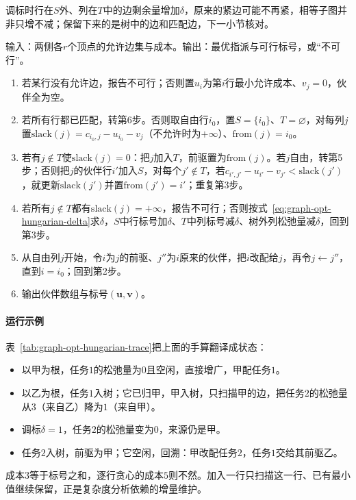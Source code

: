 调标时行在$S$外、列在$T$中的边剩余量增加$\delta$，原来的紧边可能不再紧，相等子图并非只增不减；保留下来的是树中的边和匹配边，下一小节核对。

\begin{algorithm}[KM算法]
\label{alg:graph-opt-hungarian}
输入：两侧各$r$个顶点的允许边集与成本。输出：最优指派与可行标号，或“不可行”。
\begin{enumerate}
  \item 若某行没有允许边，报告不可行；否则置$u_i$为第$i$行最小允许成本、$v_j=0$，伙伴全为空。
  \item 若所有行都已匹配，转第6步。否则取自由行$i_0$，置$S=\{i_0\}$、$T=\varnothing$，对每列$j$置$\mathrm{slack}(j)=c_{i_0,j}-u_{i_0}-v_j$（不允许时为$+\infty$）、$\mathrm{from}(j)=i_0$。
  \item 若有$j\notin T$使$\mathrm{slack}(j)=0$：把$j$加入$T$，前驱置为$\mathrm{from}(j)$。若$j$自由，转第5步；否则把$j$的伙伴行$i'$加入$S$，对每个$j'\notin T$，若$c_{i',j'}-u_{i'}-v_{j'}<\mathrm{slack}(j')$，就更新$\mathrm{slack}(j')$并置$\mathrm{from}(j')=i'$；重复第3步。
  \item 若所有$j\notin T$都有$\mathrm{slack}(j)=+\infty$，报告不可行；否则按式~\eqref{eq:graph-opt-hungarian-delta}求$\delta$，$S$中行标号加$\delta$、$T$中列标号减$\delta$、树外列松弛量减$\delta$，回到第3步。
  \item 从自由列$j$开始，令$i$为$j$的前驱、$j''$为$i$原来的伙伴，把$i$改配给$j$，再令$j\gets j''$，直到$i=i_0$；回到第2步。
  \item 输出伙伴数组与标号$(\bm u,\bm v)$。
\end{enumerate}
\end{algorithm}

\paragraph{运行示例}
表~\ref{tab:graph-opt-hungarian-trace}把上面的手算翻译成状态：
\begin{itemize}
  \item 以甲为根，任务$1$的松弛量为$0$且空闲，直接增广，甲配任务$1$。
  \item 以乙为根，任务$1$入树；它已归甲，甲入树，只扫描甲的边，把任务$2$的松弛量从$3$（来自乙）降为$1$（来自甲）。
  \item 调标$\delta=1$，任务$2$的松弛量变为$0$，来源仍是甲。
  \item 任务$2$入树，前驱为甲；它空闲，回溯：甲改配任务$2$，任务$1$交给其前驱乙。
\end{itemize}
成本$3$等于标号之和，逐行贪心的成本$5$则不然。加入一行只扫描这一行、已有最小值继续保留，正是复杂度分析依赖的增量维护。

